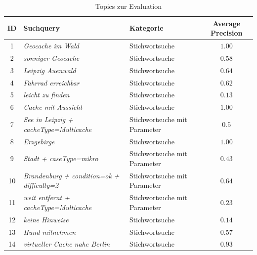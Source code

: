\documentclass[11pt,a4paper]{scrreprt}
\begin{document}
\begin{table}
\caption{Topics zur Evaluation}
\label{table:eval}
\renewcommand{\arraystretch}{1.5}
\begin{tabular}{cllc}
\toprule
ID 	&	Suchquery							&	Kategorie 				&	Average Precision\\
\midrule
1	&	\textit{Geocache im Wald}					&	Stichwortsuche			&	$1.00$\\
2	&	\textit{sonniger Geocache}				&	Stichwortsuche			&	$0.58$\\
3	&	\textit{Leipzig Auenwald}					&	Stichwortsuche			&	$0.64$\\
4	&	\textit{Fahrrad erreichbar}				&	Stichwortsuche			&	$0.62$\\
5	&	\textit{leicht zu finden}					&	Stichwortsuche			&	$0.13$\\
6	&	\textit{Cache mit Aussicht}				&	Stichwortsuche			&	$1.00$\\
7	&	\textit{See in Leipzig + cacheType=Multicache}	&	Stichwortsuche mit Parameter	& 	$0.5$\\
8	&	\textit{Erzgebirge}						&	Stichwortsuche			&	$1.00$\\
9	&	\textit{Stadt + caseType=mikro}				&	Stichwortsuche mit Parameter	&	$0.43$\\
10	&	\textit{Brandenburg + condition=ok + difficulty=2} 	&	Stichwortsuche mit Parameter	&	$0.64$\\
11	&	\textit{weit entfernt + cacheType=Multicache}	&	Stichwortsuche mit Parameter	&	$0.23$\\
12	&	\textit{keine Hinweise}					&	Stichwortsuche			&	$0.14$\\
13	&	\textit{Hund mitnehmen}					&	Stichwortsuche			&	$0.57$\\
14	&	\textit{virtueller Cache nahe Berlin}			&	Stichwortsuche			&	$0.93$\\
\bottomrule
\end{tabular}
\end{table}
\end{document}

